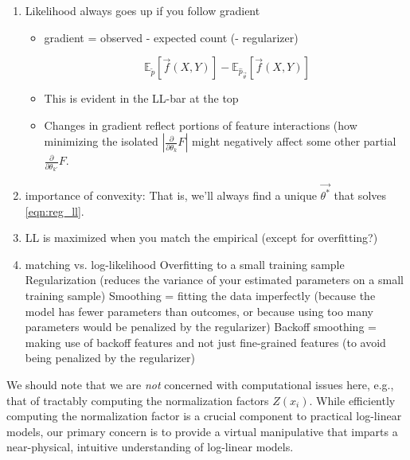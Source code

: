 \documentclass[11pt,letterpaper]{article}
\newcommand{\empirical}[0]{\ensuremath{\tilde{p}}}
\begin{document}
\begin{enumerate}[resume]
\item Likelihood always goes up if you follow gradient
\begin{itemize}
\item gradient = observed - expected count (- regularizer)

\begin{equation}
\ \mathbb{E}_{\empirical{}}\left[\vec{f}(X,Y)\right] 
- \mathbb{E}_{{\hat{p}_{\vec{\theta}}}}\left[\vec{f}(X,Y)\right]
\label{eqn:obsexp} 
\end{equation}

\item This is evident in the LL-bar at the top
\item Changes in gradient reflect portions of feature interactions (how minimizing the isolated $|\frac{\partial}{\partial \theta_k} F|$ might negatively affect some other partial $\frac{\partial}{\partial \theta_{k'}}F$.
\end{itemize}
\item importance of convexity: That is, we'll always find a unique $\vec{\theta^*}$ that solves \eqref{eqn:reg_ll}.
\item LL is maximized when you match the empirical (except for overfitting?)
\item matching vs. log-likelihood
Overfitting to a small training sample
Regularization (reduces the variance of your estimated parameters on a small training sample)
Smoothing = fitting the data imperfectly
(because the model has fewer parameters than outcomes, or because using too many parameters would be penalized by the regularizer)
Backoff smoothing = making use of backoff features and not just fine-grained features
(to avoid being penalized by the regularizer)
\end{enumerate}

We should note that we are \textit{not} concerned with computational issues here, e.g., that of tractably computing the normalization factors $Z(x_i)$. While efficiently computing the normalization factor is a crucial component to practical log-linear models, our primary concern is to provide a virtual manipulative that imparts a near-physical, intuitive understanding of log-linear models. 

\end{document}

